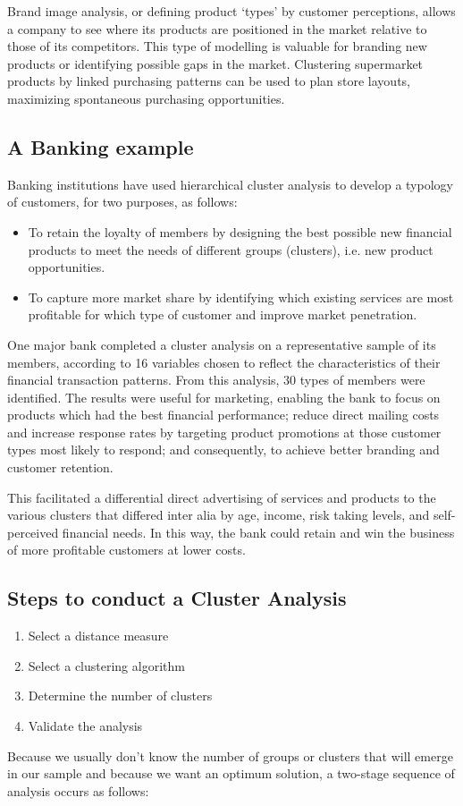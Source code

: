\documentclass[a4paper,12pt]{article}
\begin{document}
Brand image analysis, or defining product `types' by customer perceptions, allows
a company to see where its products are positioned in the market relative to those of its
competitors. This type of modelling is valuable for branding new products or identifying
possible gaps in the market. Clustering supermarket products by linked purchasing patterns
can be used to plan store layouts, maximizing spontaneous purchasing opportunities.

\subsection{A Banking example}
Banking institutions have used hierarchical cluster analysis to develop a typology of customers, for two purposes, as follows:
\begin{itemize}
\item To retain the loyalty of members by designing the best possible new financial products to meet the needs of different groups (clusters), i.e. new product opportunities.
\item To capture more market share by identifying which existing services are most profitable for which type of customer and improve market penetration.
\end{itemize}
One major bank completed a cluster analysis on a representative sample of its members, according to 16 variables chosen to reflect the characteristics of their financial transaction patterns. From this analysis, 30 types of members were identified. The results were useful for marketing, enabling the bank to focus on products which had the best financial performance; reduce direct mailing costs and increase response rates by targeting product promotions at those customer types most likely to respond; and consequently, to achieve better branding and customer retention.

This facilitated a differential direct advertising of services
and products to the various clusters that differed inter alia by age, income, risk taking levels, and self-perceived financial needs. In this way, the bank could retain and win the business of more profitable customers at lower costs.


\subsection{Steps to conduct a Cluster Analysis}
\begin{enumerate}
\item Select a distance measure
\item Select a clustering algorithm
\item Determine the number of clusters
\item Validate the analysis
\end{enumerate}
Because we usually don't know the number of groups or clusters that will emerge in our sample and because we want an optimum solution, a two-stage sequence of analysis occurs as follows:
\end{document}
